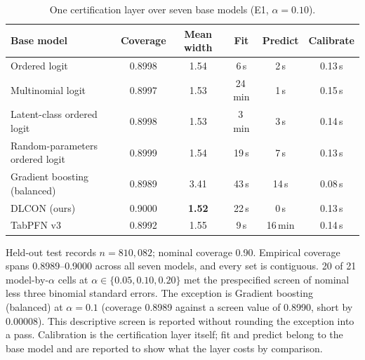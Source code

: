 \begin{table}[pos=htbp]
\caption{One certification layer over seven base models (E1, $\alpha=0.10$).}\label{tbl:models}
\centering\footnotesize
\begin{threeparttable}
\begin{tabular*}{\tblwidth}{@{\extracolsep{\fill}}lccccc@{}}
\toprule
Base model & Coverage & Mean width & Fit & Predict & Calibrate \\
\midrule
Ordered logit & 0.8998 & 1.54 & 6\,s & 2\,s & 0.13\,s \\
Multinomial logit & 0.8997 & 1.53 & 24\,min & 1\,s & 0.15\,s \\
Latent-class ordered logit & 0.8998 & 1.53 & 3\,min & 3\,s & 0.14\,s \\
Random-parameters ordered logit & 0.8999 & 1.54 & 19\,s & 7\,s & 0.13\,s \\
Gradient boosting (balanced) & 0.8989 & 3.41 & 43\,s & 14\,s & 0.08\,s \\
DLCON (ours) & 0.9000 & \textbf{1.52} & 22\,s & 0\,s & 0.13\,s \\
TabPFN v3 & 0.8992 & 1.55 & 9\,s & 16\,min & 0.14\,s \\
\bottomrule
\end{tabular*}
\begin{tablenotes}\footnotesize
\item Held-out test records $n=810,082$; nominal coverage 0.90. Empirical coverage spans 0.8989--0.9000 across all seven models, and every set is contiguous. 20 of 21 model-by-$\alpha$ cells at $\alpha\in\{0.05,0.10,0.20\}$ met the prespecified screen of nominal less three binomial standard errors. The exception is Gradient boosting (balanced) at $\alpha=0.1$ (coverage 0.8989 against a screen value of 0.8990, short by 0.00008). This descriptive screen is reported without rounding the exception into a pass. Calibration is the certification layer itself; fit and predict belong to the base model and are reported to show what the layer costs by comparison.
\end{tablenotes}
\end{threeparttable}
\end{table}